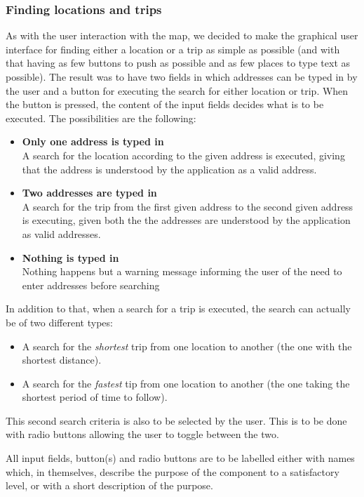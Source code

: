 \subsubsection{Finding locations and trips}
As with the user interaction with the map, we decided to make the graphical user interface for finding either a location or a trip as simple as possible (and with that having as few buttons to push as possible and as few places to type text as possible). The result was to have two fields in which addresses can be typed in by the user and a button for executing the search for either location or trip. When the button is pressed, the content of the input fields decides what is to be executed. The possibilities are the following:
\begin{itemize}
	\item \textbf{Only one address is typed in} \\
		A search for the location according to the given address is executed, giving that the address is understood by the application as a valid address.
	\item \textbf{Two addresses are typed in} \\
		A search for the trip from the first given address to the second given address is executing, given both the the addresses are understood by the application as valid addresses.
	\item \textbf{Nothing is typed in} \\
		Nothing happens but a warning message informing the user of the need to enter addresses before searching
\end{itemize}
In addition to that, when a search for a trip is executed, the search can actually be of two different types:
\begin{itemize}
	\item A search for the \textit{shortest} trip from one location to another (the one with the shortest distance).
	\item A search for the \textit{fastest} tip from one location to another (the one taking the shortest period of time to follow).
\end{itemize}
This second search criteria is also to be selected by the user. This is to be done with radio buttons allowing the user to toggle between the two.

All input fields, button(s) and radio buttons are to be labelled either with names which, in themselves, describe the purpose of the component to a satisfactory level, or with a short description of the purpose.


